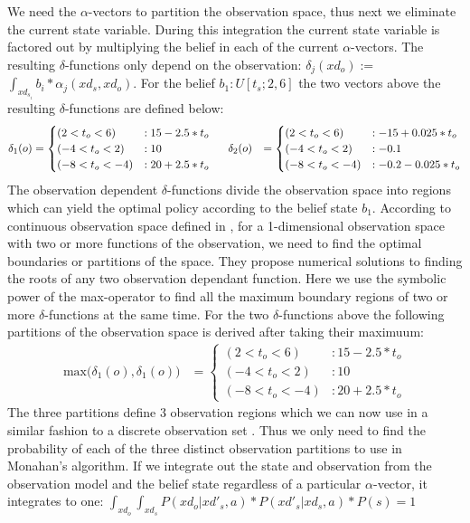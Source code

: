 \documentclass{article} %
\begin{document}
We need the $\alpha$-vectors to partition the observation space, thus next we eliminate the current state variable. During this integration the current state variable is factored out by multiplying the belief in each of the current $\alpha$-vectors.  The resulting $\delta$-functions only depend on the observation: $\delta_{j}(xd_o) := $ $\int_{xd_{s_i}} b_i * \alpha_j(xd_s,xd_o)$.
For the belief $b_1: U[t_s;2,6]$ the two vectors above the resulting $\delta$-functions are defined below: 
\begin{align}
\delta_{1}(o) &= 
\begin{cases}
 (2<t_o<6) &: 15 - 2.5*t_o \\
(-4<t_o<2) &: 10 \\
(-8<t_o<-4) &: 20 + 2.5*t_o 
\end{cases}
\hspace{5mm} 
\delta_{2}(o) &= \begin{cases}
 (2<t_o<6) &: -15 + 0.025*t_o \\
(-4<t_o<2) &: -0.1 \\
(-8<t_o<-4) &: -0.2 - 0.025*t_o 
\end{cases}
\nonumber
\end{align}
The observation dependent $\delta$-functions divide the observation space into regions which can yield the optimal policy according to the belief state $b_1$. According to continuous observation space defined in \cite{pascalPomdp}, for a 1-dimensional observation space with two or more functions of the observation, we need to find the optimal boundaries or partitions of the space. They propose numerical solutions to finding the roots of any two observation dependant function. Here we use the symbolic power of the max-operator to find all the maximum boundary regions of two or more $\delta$-functions at the same time. For the two $\delta$-functions above the following partitions of the observation space is derived after taking their maximuum: 
\begin{align}
\mathrm{max} \Bigg(\delta_{1}(o),\delta_{1}(o)\Bigg) &= 
\begin{cases}
 (2<t_o<6) &: 15 - 2.5*t_o \\
(-4<t_o<2) &: 10 \\
(-8<t_o<-4) &: 20 + 2.5*t_o 
\end{cases}
\nonumber
\end{align}
The three partitions define 3 observation regions which we can now use in a similar fashion to a discrete observation set . Thus we only need to find the probability of each of the three distinct observation partitions to use in Monahan's algorithm. If we integrate out the state and observation from the observation model and the belief state regardless of a particular $\alpha$-vector, it integrates to one: 
$\int_{xd_o}\int_{xd_s} P(xd_o|xd'_s,a)*P(xd'_s|xd_s,a)*P(s) = 1$
\end{document}
